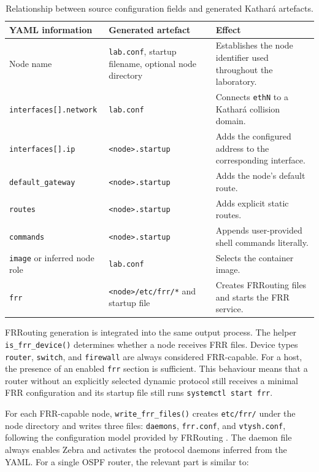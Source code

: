 \begin{table}[htbp]
\centering
\small
\begin{tabular}{p{}p{}p{}}
\toprule
\textbf{YAML information} & \textbf{Generated artefact} & \textbf{Effect} \\
\midrule
Node name & \texttt{lab.conf}, startup filename, optional node directory & Establishes the node identifier used throughout the laboratory. \\
\texttt{interfaces[].network} & \texttt{lab.conf} & Connects \texttt{ethN} to a Kathar\'a collision domain. \\
\texttt{interfaces[].ip} & \texttt{<node>.startup} & Adds the configured address to the corresponding interface. \\
\texttt{default\_gateway} & \texttt{<node>.startup} & Adds the node's default route. \\
\texttt{routes} & \texttt{<node>.startup} & Adds explicit static routes. \\
\texttt{commands} & \texttt{<node>.startup} & Appends user-provided shell commands literally. \\
\texttt{image} or inferred node role & \texttt{lab.conf} & Selects the container image. \\
\texttt{frr} & \texttt{<node>/etc/frr/*} and startup file & Creates FRRouting files and starts the FRR service. \\
\bottomrule
\end{tabular}
\caption{Relationship between source configuration fields and generated Kathar\'a artefacts.}
\label{tab:yaml-to-generated}
\end{table}

FRRouting generation is integrated into the same output process. The helper
\texttt{is\_frr\_device()} determines whether a node receives FRR files. Device
types \texttt{router}, \texttt{switch}, and \texttt{firewall} are always
considered FRR-capable. For a host, the presence of an enabled \texttt{frr}
section is sufficient. This behaviour means that a router without an explicitly
selected dynamic protocol still receives a minimal FRR configuration and its
startup file still runs \texttt{systemctl start frr}.

For each FRR-capable node, \texttt{write\_frr\_files()} creates
\texttt{etc/frr/} under the node directory and writes three files:
\texttt{daemons}, \texttt{frr.conf}, and \texttt{vtysh.conf}, following the
configuration model provided by FRRouting \cite{frr_user_guide}. The daemon file
always enables Zebra and activates the protocol daemons inferred from the YAML.
For a single OSPF router, the relevant part is similar to:

